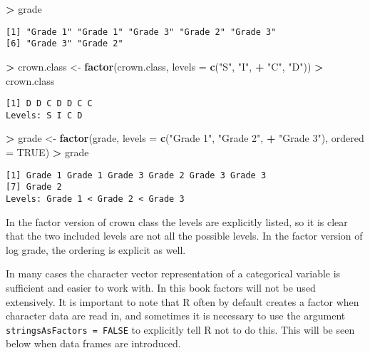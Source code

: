 \documentclass[]{krantz}
\makeatletter
\newenvironment{Shaded}{\begin{snugshade}}{\end{snugshade}}
\newcommand{\KeywordTok}[1]{\textcolor[rgb]{0.27,0.27,0.27}{\textbf{#1}}}
\newcommand{\DataTypeTok}[1]{\textcolor[rgb]{0.27,0.27,0.27}{#1}}
\newcommand{\StringTok}[1]{\textcolor[rgb]{0.5,0.5,0.5}{#1}}
\newcommand{\OtherTok}[1]{\textcolor[rgb]{0.37,0.37,0.37}{#1}}
\newcommand{\OperatorTok}[1]{\textcolor[rgb]{0.43,0.43,0.43}{\textbf{#1}}}
\newcommand{\NormalTok}[1]{#1}
\newenvironment{kframe}{%
\medskip{}
\setlength{\fboxsep}{.8em}
 \def\at@end@of@kframe{}%
 \ifinner\ifhmode%
  \def\at@end@of@kframe{\end{minipage}}%
  \begin{minipage}{\columnwidth}%
 \fi\fi%
 \def\FrameCommand##1{\hskip\@totalleftmargin \hskip-\fboxsep
 \colorbox{shadecolor}{##1}\hskip-\fboxsep
     \hskip-\linewidth \hskip-\@totalleftmargin \hskip\columnwidth}%
 \MakeFramed {\advance\hsize-\width
   \@totalleftmargin\z@ \linewidth\hsize
   \@setminipage}}%
 {\par\unskip\endMakeFramed%
 \at@end@of@kframe}
\renewenvironment{Shaded}{\begin{kframe}}{\end{kframe}}
\theoremstyle{definition}
\theoremstyle{definition}
\theoremstyle{definition}
\theoremstyle{remark}
\makeatother
\begin{document}
\begin{Shaded}
\begin{Highlighting}[]
\OperatorTok{>}\StringTok{ }\NormalTok{grade}
\end{Highlighting}
\end{Shaded}

\begin{verbatim}
[1] "Grade 1" "Grade 1" "Grade 3" "Grade 2" "Grade 3"
[6] "Grade 3" "Grade 2"
\end{verbatim}

\begin{Shaded}
\begin{Highlighting}[]
\OperatorTok{>}\StringTok{ }\NormalTok{crown.class <-}\StringTok{ }\KeywordTok{factor}\NormalTok{(crown.class, }\DataTypeTok{levels =} \KeywordTok{c}\NormalTok{(}\StringTok{"S"}\NormalTok{, }\StringTok{"I"}\NormalTok{, }
\OperatorTok{+}\StringTok{   "C"}\NormalTok{, }\StringTok{"D"}\NormalTok{))}
\OperatorTok{>}\StringTok{ }\NormalTok{crown.class}
\end{Highlighting}
\end{Shaded}

\begin{verbatim}
[1] D D C D D C C
Levels: S I C D
\end{verbatim}

\begin{Shaded}
\begin{Highlighting}[]
\OperatorTok{>}\StringTok{ }\NormalTok{grade <-}\StringTok{ }\KeywordTok{factor}\NormalTok{(grade, }\DataTypeTok{levels =} \KeywordTok{c}\NormalTok{(}\StringTok{"Grade 1"}\NormalTok{, }\StringTok{"Grade 2"}\NormalTok{, }
\OperatorTok{+}\StringTok{   "Grade 3"}\NormalTok{), }\DataTypeTok{ordered =} \OtherTok{TRUE}\NormalTok{)}
\OperatorTok{>}\StringTok{ }\NormalTok{grade}
\end{Highlighting}
\end{Shaded}

\begin{verbatim}
[1] Grade 1 Grade 1 Grade 3 Grade 2 Grade 3 Grade 3
[7] Grade 2
Levels: Grade 1 < Grade 2 < Grade 3
\end{verbatim}

In the factor version of crown class the levels are explicitly listed,
so it is clear that the two included levels are not all the possible
levels. In the factor version of log grade, the ordering is explicit as
well.

In many cases the character vector representation of a categorical
variable is sufficient and easier to work with. In this book factors
will not be used extensively. It is important to note that R often by
default creates a factor when character data are read in, and sometimes
it is necessary to use the argument \texttt{stringsAsFactors\ =\ FALSE}
to explicitly tell R not to do this. This will be seen below when data
frames are introduced.
\end{document}
